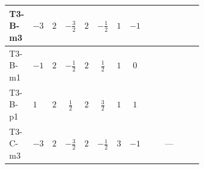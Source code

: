 \documentclass[8pt]{article}
\begin{document}
\begin{landscape}
\begin{longtable}{@{}llcccccc >{\raggedright\arraybackslash}p{0.21\linewidth} >{\raggedright\arraybackslash}p{0.21\linewidth} >{\raggedright\arraybackslash}p{0.21\linewidth}@{}}
\midrule
T3-B-m3 & $-3$ & $2$ & $-\frac{3}{2}$ & $2$ & $-\frac{1}{2}$ & $1$ & $-1$ & \scriptsize\adjustbox{max width=\linewidth}{$\begin{gathered} +4 {\lambda_{12}^{(1)}} {m_2^2}\end{gathered}$} & \scriptsize\adjustbox{max width=\linewidth}{$\begin{gathered} {m_1^2} (2 T_{\nu}^{(1)}+6 {\lambda_{S_1}^{(1)}})\end{gathered}$} & \scriptsize\adjustbox{max width=\linewidth}{$\begin{gathered} -\frac{9 {g_2}^2 {m_1^2}}{2}\end{gathered}$} \\
\midrule
T3-B-m1 & $-1$ & $2$ & $-\frac{1}{2}$ & $2$ & $\frac{1}{2}$ & $1$ & $0$ & \scriptsize\adjustbox{max width=\linewidth}{$\begin{gathered} +4 {\lambda_{12}^{(1)}} {m_2^2}\end{gathered}$} & \scriptsize\adjustbox{max width=\linewidth}{$\begin{gathered} {m_1^2} (2 T_{\nu}^{(1)}+6 {\lambda_{S_1}^{(1)}})\end{gathered}$} & \scriptsize\adjustbox{max width=\linewidth}{$\begin{gathered} -\frac{9 {g_2}^2 {m_1^2}}{2}\end{gathered}$} \\
\midrule
T3-B-p1 & $1$ & $2$ & $\frac{1}{2}$ & $2$ & $\frac{3}{2}$ & $1$ & $1$ & \scriptsize\adjustbox{max width=\linewidth}{$\begin{gathered} +4 {\lambda_{12}^{(1)}} {m_2^2}\end{gathered}$} & \scriptsize\adjustbox{max width=\linewidth}{$\begin{gathered} {m_1^2} (2 T_{\nu}^{(1)}+6 {\lambda_{S_1}^{(1)}})\end{gathered}$} & \scriptsize\adjustbox{max width=\linewidth}{$\begin{gathered} -\frac{9 {g_2}^2 {m_1^2}}{2}\end{gathered}$} \\
\midrule
T3-C-m3 & $-3$ & $2$ & $-\frac{3}{2}$ & $2$ & $-\frac{1}{2}$ & $3$ & $-1$ & \scriptsize\adjustbox{max width=\linewidth}{$\begin{gathered} +4 {\lambda_{12}^{(1)}} {m_2^2}\end{gathered}$} & --- & \scriptsize\adjustbox{max width=\linewidth}{$\begin{gathered} -\frac{9 {g_2}^2 {m_1^2}}{2}\end{gathered}$} \\

\end{longtable}
\end{landscape}
\end{document}
